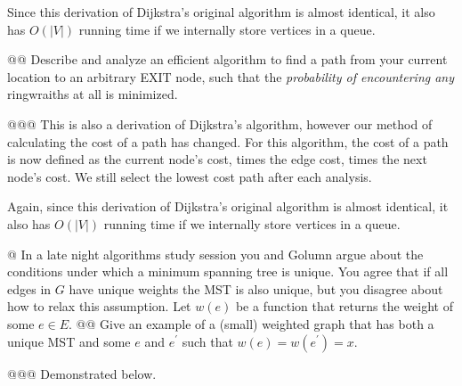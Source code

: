 \documentclass[10pt]{article}\usepackage[]{graphicx}\usepackage[]{xcolor}
\newenvironment{knitrout}{}{} %
\begin{document}
\begin{easylist}[enumerate]
    Since this derivation of Dijkstra's original algorithm is almost identical, it also has $O(|V|)$ running time if we
    internally store vertices in a queue.

    @@ Describe and analyze an efficient algorithm to find a path from your current location to an arbitrary EXIT node,
    such that the \textit{probability of encountering any} ringwraiths at all is minimized.

    @@@ This is also a derivation of Dijkstra's algorithm, however our method of calculating the cost of a path has
    changed. For this algorithm, the cost of a path is now defined as the current node's cost, times the edge cost,
    times the next node's cost. We still select the lowest cost path after each analysis.\newline

    Again, since this derivation of Dijkstra's original algorithm is almost identical, it also has $O(|V|)$ running time
    if we internally store vertices in a queue.

    @ In a late night algorithms study session you and Golumn argue about the conditions under which a minimum spanning
    tree is unique. You agree that if all edges in $G$ have unique weights the MST is also unique, but you disagree
    about how to relax this assumption. Let $w(e)$ be a function that returns the weight of some $e \in E$.
    @@ Give an example of a (small) weighted graph that has both a unique MST and some $e$ and $e^\prime$ such that
    $w(e) = w(e^\prime) = x$.

    @@@ Demonstrated below.

\begin{knitrout}
\color{fgcolor}\begin{figure}[H]
\end{figure}
\end{knitrout}
\end{easylist}
\end{document}

